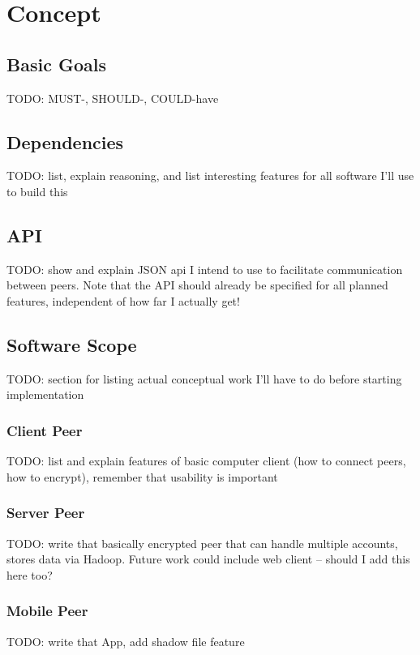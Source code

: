 \chapter{Concept}
\label{chap:concept}


\section{Basic Goals}

TODO: MUST-, SHOULD-, COULD-have

\section{Dependencies}

TODO: list, explain reasoning, and list interesting features for all software I'll use to build this

\section{API}

TODO: show and explain JSON api I intend to use to facilitate communication between peers.
Note that the API should already be specified for all planned features, independent of how far I actually get!

\section{Software Scope}

TODO: section for listing actual conceptual work I'll have to do before starting implementation

\subsection{Client Peer}

TODO: list and explain features of basic computer client (how to connect peers, how to encrypt), remember that usability is important

\subsection{Server Peer}

TODO: write that basically encrypted peer that can handle multiple accounts, stores data via Hadoop.
Future work could include web client – should I add this here too?

\subsection{Mobile Peer}

TODO: write that App, add shadow file feature
